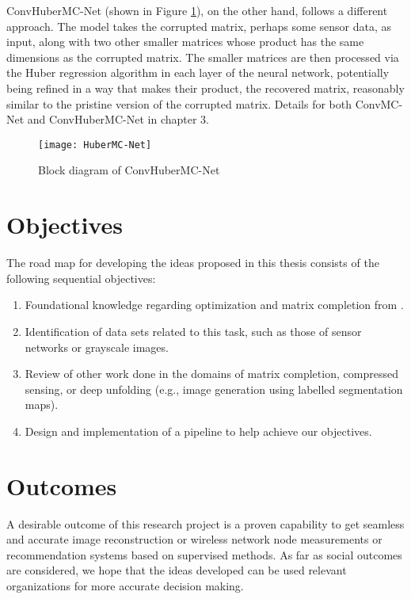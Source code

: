 ConvHuberMC-Net (shown in Figure \ref{fig:convhubermc_block}), on the other hand, follows a different approach. The model takes the corrupted matrix, perhaps some sensor data, as input, along with two other smaller matrices whose product has the same dimensions as the corrupted matrix. The smaller matrices are then processed via the Huber regression algorithm in each layer of the neural network, potentially being refined in a way that makes their product, the recovered matrix, reasonably similar to the pristine version of the corrupted matrix. Details for both ConvMC-Net and ConvHuberMC-Net in chapter 3. 

\begin{figure}
    \centering
    \texttt{[image: HuberMC-Net]}
    \caption{Block diagram of ConvHuberMC-Net}
    \label{fig:convhubermc_block}
\end{figure}

\section{Objectives}
The road map for developing the ideas proposed in this thesis consists of the following sequential objectives:
\begin{enumerate}
    \item Foundational knowledge regarding optimization and matrix completion from \cite{Wright-Ma-2022}.
    \item Identification of data sets related to this task, such as those of sensor networks or grayscale images.
    \item Review of other work done in the domains of matrix completion, compressed sensing, or deep unfolding (e.g., image generation using labelled segmentation maps).
    \item Design and implementation of a pipeline to help achieve our objectives.
\end{enumerate}

\section{Outcomes}
A desirable outcome of this research project is a proven capability to get seamless and accurate image reconstruction or wireless network node measurements or recommendation systems based on supervised methods. As far as social outcomes are considered, we hope that the ideas developed can be used relevant organizations for more accurate decision making.

